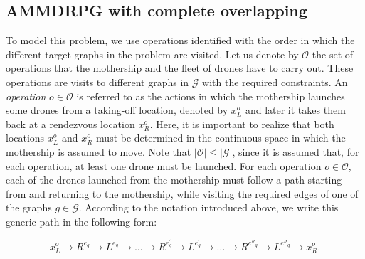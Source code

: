 \documentclass[10pt,a4paper]{elsarticle}
\def\AMD{{\sf AMMDRPG\xspace}}
\newcommand{\EN}[1]{{\color{black}#1}}
\begin{document}
\subsection{\AMD\xspace  with complete overlapping} \label{subsec:CO}
\noindent
To model this problem, we use operations identified with the order in which the different target graphs in the problem are visited. Let us denote by $\mathcal O$ the set of operations that the mothership and the fleet of drones have to carry out. These operations are visits to different graphs in $\mathcal G$ with the required constraints. An \textit{operation} $o\in\mathcal O$ is referred to as the actions in which the mothership launches some drones from a taking-off location, denoted by $x_L^o$ and later it takes them back \EN{at} a rendezvous location $x_R^o$. Here, it is important to realize that both locations $x_L^o$ and $x_R^o$ must be determined in the continuous space \EN{in which} the mothership is assumed to move. Note that $|\mathcal O|\leq|\mathcal G|$, since it is assumed that, for each operation, at least one drone must be launched.
\noindent
For each operation $o\in\mathcal O$, each of the drones launched from the mothership must follow a path starting from and returning to the mothership, while visiting the required edges of one of the graph\EN{s} $g \in \mathcal G$. According to the notation introduced above, we write this generic path in the following form:

$$
x_L^o\rightarrow R^{e_g}\rightarrow L^{e_g}\rightarrow\ldots\rightarrow R^{e^\prime_g}\rightarrow L^{e^\prime_g}\rightarrow \ldots \rightarrow R^{e''_g}  \rightarrow L^{e''_g} \rightarrow x_R^o. 
$$
\end{document}
